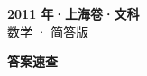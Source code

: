 \documentclass[zihao=-4, a4paper]{ctexart}
\begin{document}
\begin{center}
  {\Large\bfseries 2011 年·上海卷·文科}\\[4pt]
  {\large 数学 · 简答版}
\end{center}
\medskip
{}

\clearpage
{}
\begin{center}{\Large\bfseries 答案速查}\end{center}
\medskip

\end{document}

